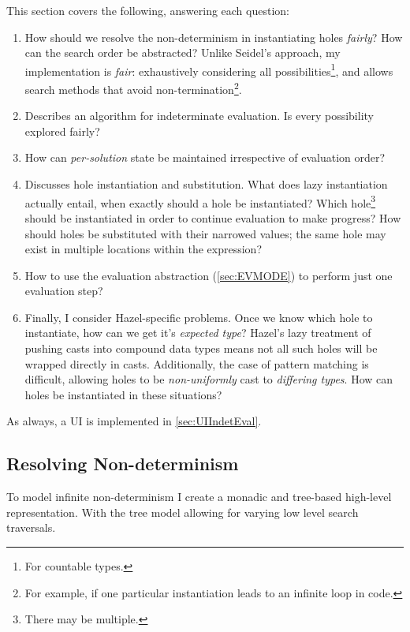 This section covers the following, answering each question:
\begin{enumerate}
\item[\ref{sec:ResolvingNondeterminism}] How should we resolve the non-determinism in instantiating holes \textit{fairly}? How can the search order be abstracted? Unlike Seidel's approach, my implementation is \textit{fair}: exhaustively considering all possibilities\footnote{For countable types.}, and allows search methods that avoid non-termination\footnote{For example, if one particular instantiation leads to an infinite loop in code.}.
\item[\ref{sec:IndetEvalAlgorithm}] Describes an algorithm for indeterminate evaluation. Is every possibility explored fairly?
\item[\ref{sec:ThreadingState}] How can \textit{per-solution} state be maintained irrespective of evaluation order?
\item[\ref{sec:HoleInstantiation}] Discusses hole instantiation and substitution. What does lazy instantiation actually entail, when exactly should a hole be instantiated? Which hole\footnote{There may be multiple.} should be instantiated in order to continue evaluation to make progress? How should holes be substituted with their narrowed values; the same hole may exist in multiple locations within the expression?
\item[\ref{sec:OneStepEvaluator}] How to use the evaluation abstraction (\cref{sec:EVMODE}) to perform just one evaluation step?
\item[\ref{sec:TypesForHoles}] Finally, I consider Hazel-specific problems. Once we know which hole to instantiate, how can we get it's \textit{expected type}? Hazel's lazy treatment of pushing casts into compound data types means not all such holes will be wrapped directly in casts. Additionally, the case of pattern matching is difficult, allowing holes to be \textit{non-uniformly} cast to \textit{differing types}. How can holes be instantiated in these situations?
\end{enumerate}
As always, a UI is implemented in \cref{sec:UIIndetEval}.

\subsection{Resolving Non-determinism}
\label{sec:ResolvingNondeterminism}
To model infinite non-determinism I create a monadic and tree-based high-level representation. With the tree model allowing for varying low level search traversals.

